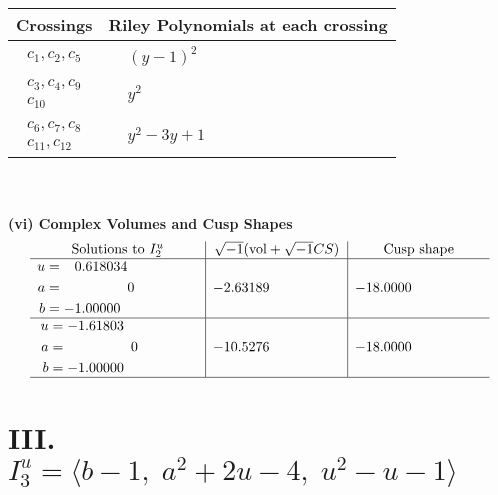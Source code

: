 \documentclass[1p]{elsarticle_modified}
\theoremstyle{definition}
\newcommand{\I}{\sqrt{-1}}
\begin{document}
\begin{tabular}{m{50pt}|m{274pt}}
Crossings & \hspace{64pt}Riley Polynomials at each crossing \\
\hline $$\begin{aligned}c_{1},c_{2},c_{5}\end{aligned}$$&$\begin{aligned}
&(y-1)^2
\end{aligned}$\\
\hline $$\begin{aligned}c_{3},c_{4},c_{9}\\c_{10}\end{aligned}$$&$\begin{aligned}
&y^2
\end{aligned}$\\
\hline $$\begin{aligned}c_{6},c_{7},c_{8}\\c_{11},c_{12}\end{aligned}$$&$\begin{aligned}
&y^2-3 y+1
\end{aligned}$\\
\hline
\end{tabular}\\~\\
\newpage\flushleft \textbf{(vi) Complex Volumes and Cusp Shapes}
$$\begin{array}{c|c|c}  
\text{Solutions to }I^u_{2}& \I (\text{vol} + \sqrt{-1}CS) & \text{Cusp shape}\\
 \hline 
\begin{aligned}
u &= \phantom{-}0.618034\phantom{ +0.000000I} \\
a &= \phantom{-0.000000 } 0 \\
b &= -1.00000\phantom{ +0.000000I}\end{aligned}
 & -2.63189\phantom{ +0.000000I} & -18.0000\phantom{ +0.000000I} \\ \hline\begin{aligned}
u &= -1.61803\phantom{ +0.000000I} \\
a &= \phantom{-0.000000 } 0 \\
b &= -1.00000\phantom{ +0.000000I}\end{aligned}
 & -10.5276\phantom{ +0.000000I} & -18.0000\phantom{ +0.000000I}\\
 \hline 
 \end{array}$$\newpage\newpage\renewcommand{\arraystretch}{1}
\centering \section*{III. $I^u_{3}= \langle b-1,\;a^2+2 u-4,\;u^2- u-1 \rangle$}
\end{document}
